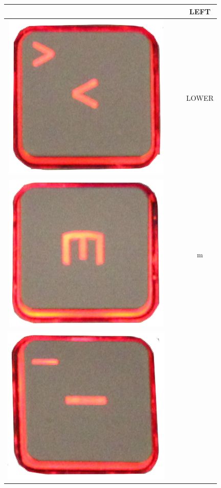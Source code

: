 \begin{longtable}{cccc}
\begin{minipage}[c]{.3\textwidth}
\vspace{0.2cm}
\end{minipage} & & & LEFT\\
\hline
\begin{minipage}[c]{.3\textwidth}
\vspace{0.2cm}
\includegraphics[scale=0.1]{Images/KeyMapping/LOWER}
\vspace{0.2cm}
\end{minipage} & & & LOWER\\
\hline
\begin{minipage}[c]{.3\textwidth}
\vspace{0.2cm}
\includegraphics[scale=0.1]{Images/KeyMapping/m}
\vspace{0.2cm}
\end{minipage} & & & m\\
\hline
\begin{minipage}[c]{.3\textwidth}
\vspace{0.2cm}
\includegraphics[scale=0.1]{Images/KeyMapping/MINUS}

\end{minipage}
\end{longtable}
